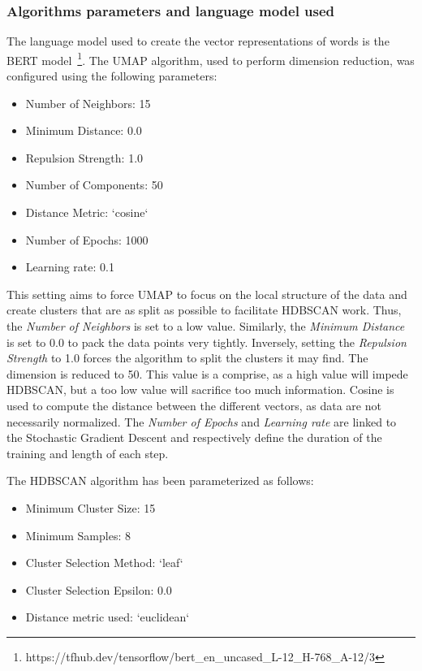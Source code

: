 \subsubsection{Algorithms parameters and language model used}
The language model used to create the vector representations of words is the BERT
model~\footnote{https://tfhub.dev/tensorflow/bert\_en\_uncased\_L-12\_H-768\_A-12/3}.
The UMAP algorithm, used to perform dimension reduction, was configured using the following parameters:

\begin{itemize}
    \item Number of Neighbors: 15
    \item Minimum Distance: 0.0
    \item Repulsion Strength: 1.0
    \item Number of Components: 50
    \item Distance Metric: `cosine`
    \item Number of Epochs: 1000
    \item Learning rate: 0.1
\end{itemize}

This setting aims to force UMAP to focus on the local structure of the data and create clusters that are as split as possible to facilitate HDBSCAN work.
Thus, the \textit{Number of Neighbors} is set to a low value.
Similarly, the \textit{Minimum Distance} is set to 0.0 to pack the data points very tightly.
Inversely, setting the \textit{Repulsion Strength} to 1.0 forces the algorithm to split the clusters it may find.
The dimension is reduced to 50.
This value is a comprise, as a high value will impede HDBSCAN, but a too low value will sacrifice too much information.
Cosine is used to compute the distance between the different vectors, as data are not necessarily normalized.
The \textit{Number of Epochs} and \textit{Learning rate} are linked to the Stochastic Gradient Descent and respectively define the duration of the training and length of each step.

The HDBSCAN algorithm has been parameterized as follows:

\begin{itemize}
    \item Minimum Cluster Size: 15
    \item Minimum Samples: 8
    \item Cluster Selection Method: `leaf`
    \item Cluster Selection Epsilon: 0.0
    \item Distance metric used: `euclidean`
\end{itemize}

